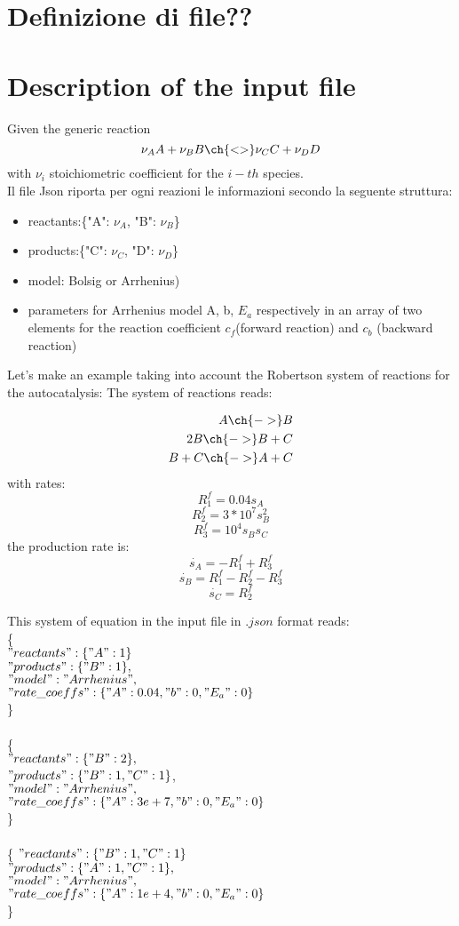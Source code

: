 \documentclass[11pt]{amsart}
\begin{document}
\section{Definizione di file??}
\section{Description of the input file}
Given the generic reaction
$$
\nu_A A + \nu_B B \ch{<>} \nu_C C + \nu_D D    
$$
with $\nu_i$ stoichiometric coefficient for the $i-th$ species.\\
Il file Json riporta per ogni reazioni le informazioni secondo la seguente struttura:
\begin{itemize}
    \item reactants:\{"A": $\nu_A$, "B": $\nu_B$\}
    \item products:\{"C": $\nu_C$, "D": $\nu_D$\}
    \item model: Bolsig or Arrhenius)
    \item parameters for Arrhenius model A, b, $E_{a}$ respectively in an array of two elements for the reaction coefficient $c_{f}$(forward reaction) and  $c_{b}$ (backward reaction)
\end{itemize}

Let's make an example taking into account the Robertson system of reactions for the autocatalysis:
The system of reactions reads:

\begin{align}
    A \ch{->} B \\
    2B\ch{->} B + C\\
    B +C \ch{->} A + C
\end{align}
with rates:
$$
R_1^f=0.04 s_A
$$
$$
R_2^f=3*10^7 s_B^2
$$
$$
R_3^f=10^4 s_Bs_C
$$
the production rate is:
$$
\dot{s_A}=-R_1^f + R_3^f
$$
$$
\dot{s_B}=R_1^f - R_2^f-R_3^f
$$
$$
\dot{s_C}=R_2^f 
$$

This system of equation in the input file in $.json$ format reads:\\
\{\\
$"reactants" : \{ "A" : 1\}$\\
$"products" : \{ "B" : 1\},$\\
$"model": "Arrhenius",$\\
$"rate\_coeffs" : \{"A":0.04, "b":0,"E_a":0\}$\\
\}\\
\\
\{\\
$"reactants" : \{ "B" : 2 \},$\\
$"products" : \{ "B" : 1, "C" : 1 \}$,\\
$"model": "Arrhenius",$\\
$"rate\_coeffs" : \{"A":3e+7, "b":0,"E_a":0\}$\\
\}\\
\\
\{
$"reactants":\{ "B" : 1, "C" : 1 \}$\\
$"products" : \{ "A" : 1, "C" : 1 \},$\\
$"model": "Arrhenius",$\\
$"rate\_coeffs" : \{"A":1e+4, "b":0,"E_a":0\}$\\
\}\\
\end{document}
